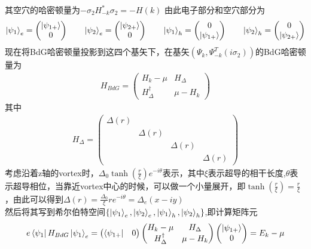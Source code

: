 \documentclass[22pt]{article}
\begin{document}
	其空穴的哈密顿量为$-\sigma_2H_{-k}^{*}\sigma_2=-H(k)$
	由此电子部分和空穴部分为
	\begin{align}
		\nonumber
		\ket{\psi_1}_e=
		\begin{pmatrix}
			\ket{\psi_{1+}}\\
			0
		\end{pmatrix}
		\qquad
		\ket{\psi_2}_e=
		\begin{pmatrix}
			\ket{\psi_{2+}}
			\\
			0
		\end{pmatrix}
		\qquad
		\ket{\psi_1}_h=
		\begin{pmatrix}
			0\\
			\ket{\psi_{1+}}
		\end{pmatrix}
		\qquad
		\ket{\psi_2}_h=
		\begin{pmatrix}
			0\\
			\ket{\psi_{2+}}
		\end{pmatrix}
	\end{align}
现在将BdG哈密顿量投影到这四个基矢下，在基矢$(\Psi_k,\Psi_{-k}^{T}(i\sigma_2))$的BdG哈密顿量为
\begin{align}
	H_{BdG}=
	\begin{pmatrix}
		H_k-\mu &  H_{\Delta}  \\
		H_{\Delta}^{\dagger} & \mu-H_k
	\end{pmatrix}
\end{align}
其中
\begin{align}
	H_{\Delta}=
	\begin{pmatrix}
		\Delta(r) & & &\\
		&\Delta(r) & &\\
		&& \Delta(r) &\\
		&&&\Delta(r)
	\end{pmatrix}
\end{align}
考虑沿着z轴的vortex时，$\Delta_0\tanh(\frac{r}{\xi})e^{-i\theta}$表示，其中$\xi$表示超导的相干长度,$\theta$表示超导相位，当靠近vortex中心的时候，可以做一个小量展开，即$\tanh(\frac{r}{\xi})=\frac{r}{\xi}$，由此可以得到$\Delta(r)=\frac{\Delta_0}{\xi}re^{-i\theta}=\Delta_e(x-iy)$
\\
然后将其写到希尔伯特空间$\{\ket{\psi_1}_e,\ket{\psi_2}_e,\ket{\psi_1}_h,\ket{\psi_2}_h\}$,即计算矩阵元
\begin{align}
	e\bra{\psi_1}H_{BdG}\ket{\psi_1}_e=
	\begin{pmatrix}
		\bra{\psi_{1+}}&0
	\end{pmatrix}
	\begin{pmatrix}
	H_k-\mu &  H_{\Delta}  \\
	H_{\Delta}^{\dagger} & \mu-H_k
\end{pmatrix}
\begin{pmatrix}
	   \ket{\psi_{1+}}\\
	   0
\end{pmatrix}
=E_k-\mu
\end{align}
\end{document}
